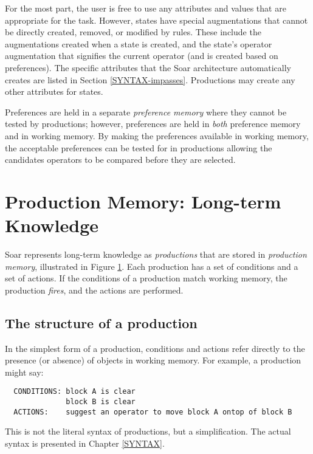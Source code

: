 For the most part, the user is free to use any attributes and values
that are appropriate for the task. However, states have special
augmentations that cannot be directly created, removed, or modified by
rules.  These include the augmentations created when a state is created,
and the state's operator augmentation that signifies the current
operator (and is created based on preferences).  The specific
attributes that the Soar architecture automatically creates are listed in Section
\ref{SYNTAX-impasses}. Productions may create any other attributes for
states.

Preferences are held in a separate \emph{preference memory} where they cannot be
tested by productions; however,  preferences 
are held in \emph{both} preference memory and in working memory. By making the
 preferences available in working memory, 
the acceptable preferences can be tested for in productions allowing the
candidates operators to be compared before they are selected.

\section{Production Memory: Long-term Knowledge} 
\label{ARCH-pm}

\begin{figure}
\label{fig:ab-prodmem}
\end{figure}

Soar represents long-term knowledge as \emph{productions} that are stored in
\emph{production memory}, illustrated in Figure \ref{fig:ab-prodmem}. Each
production has a set of conditions and a set of actions.  If the
conditions of a production match working memory, the production
\emph{fires}, and the actions are performed.

\subsection{The structure of a production}
\label{ARCH-pm-structure}

In the simplest form of a production, conditions and actions refer directly to
the presence (or absence) of objects in working memory. For example, a
production might say:
\begin{verbatim}
  CONDITIONS: block A is clear 
              block B is clear 
  ACTIONS:    suggest an operator to move block A ontop of block B
\end{verbatim}
This is not the literal syntax of productions, but a simplification.
The actual syntax is presented in Chapter \ref{SYNTAX}.

